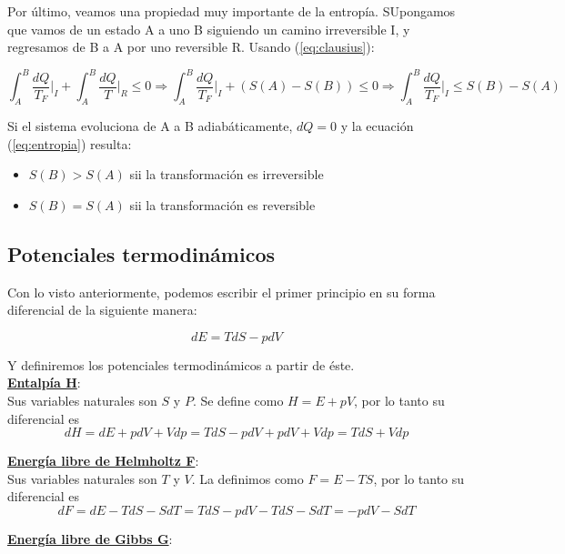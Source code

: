 \documentclass[a4paper]{article}
\begin{document}
Por \'ultimo, veamos una propiedad muy importante de la entrop\'ia. SUpongamos que vamos de un estado A a uno B siguiendo un camino irreversible I, y regresamos de B a A por uno reversible R. Usando (\ref{eq:clausius}):

\begin{equation}
\label{eq:entropia}
\int_{A}^{B} \frac{dQ}{T_{F}}\bigg|_{I} +  \int_{A}^{B} \frac{dQ}{T}\bigg|_{R} \leq 0 \Rightarrow \int_{A}^{B} \frac{dQ}{T_{F}}\bigg|_{I} + (S(A) - S(B)) \leq 0 \Rightarrow \int_{A}^{B} \frac{dQ}{T_{F}}\bigg|_{I} \leq S(B) - S(A)
\end{equation}

Si el sistema evoluciona de A a B adiab\'aticamente, $dQ = 0$ y la ecuaci\'on (\ref{eq:entropia}) resulta:

\begin{itemize}
\item $S(B) > S(A)$ sii la transformaci\'on es irreversible
\item $S(B) = S(A)$ sii la transformaci\'on es reversible
\end{itemize}

\subsection{Potenciales termodin\'amicos}

Con lo visto anteriormente, podemos escribir el primer principio en su forma diferencial de la siguiente manera:

\begin{equation}
\label{eq:pt_energia}
dE = TdS - pdV
\end{equation}

Y definiremos los potenciales termodin\'amicos a partir de \'este.\\

\underline{\textbf{Entalp\'ia H}}:\\

Sus variables naturales son $S$ y $P$. Se define como $H = E + pV$, por lo tanto su diferencial es $$dH = dE + pdV + Vdp = TdS - pdV + pdV + Vdp = TdS + Vdp$$

\underline{\textbf{Energ\'ia libre de Helmholtz F}}:\\

Sus variables naturales son $T$ y $V$. La definimos como $F = E - TS$, por lo tanto su diferencial es $$dF = dE - TdS - SdT = TdS - pdV - TdS - SdT = -pdV - SdT$$

\underline{\textbf{Energ\'ia libre de Gibbs G}}:\\
\end{document}
